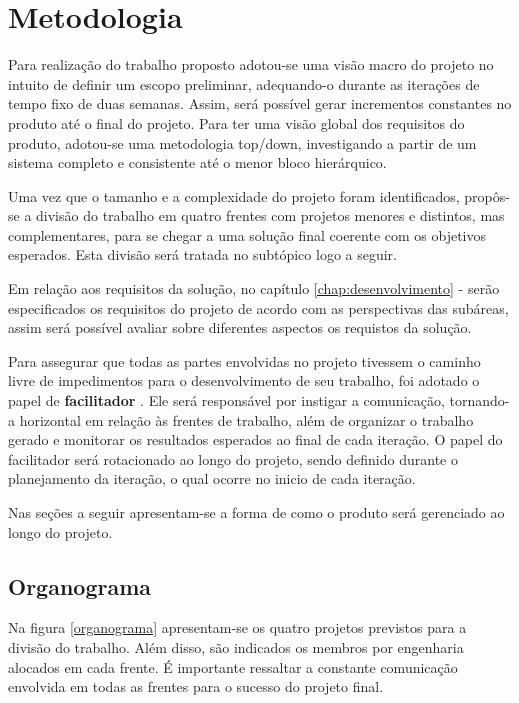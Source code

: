 \chapter{Metodologia}
\label{chap:metodologia}
	
	Para realização do trabalho proposto adotou-se uma visão macro do projeto no intuito de definir um escopo preliminar, adequando-o durante as iterações de tempo fixo de duas semanas. Assim, será possível gerar incrementos constantes no produto até o final do projeto. Para ter uma visão global dos requisitos do produto, adotou-se uma metodologia top/down, investigando a partir de um sistema completo e consistente até o menor bloco hierárquico.

	Uma vez que o tamanho e a complexidade do projeto foram identificados, propôs-se a divisão do trabalho em quatro frentes com projetos menores e distintos, mas complementares, para se chegar a uma solução final coerente com os objetivos esperados. Esta divisão será tratada no subtópico logo a seguir.

	Em relação aos requisitos da solução, no capítulo \ref{chap:desenvolvimento} -  serão especificados os requisitos do projeto de acordo com as perspectivas das subáreas, assim será possível avaliar sobre diferentes aspectos os requistos da solução.

	Para assegurar que todas as partes envolvidas no projeto tivessem o caminho livre de impedimentos para o desenvolvimento de seu trabalho, foi adotado o papel de \textbf{facilitador} \cite{Facilitador}. Ele será responsável por instigar a comunicação, tornando-a horizontal em relação às frentes de trabalho, além de organizar o trabalho gerado e monitorar os resultados esperados ao final de cada iteração. O papel do facilitador será rotacionado ao longo do projeto, sendo definido durante o planejamento da iteração, o qual ocorre no inicio de cada iteração.

	Nas seções a seguir apresentam-se a forma de como o produto será gerenciado ao longo do projeto.


	\section{Organograma}

		Na figura \ref{organograma} apresentam-se os quatro projetos previstos para a divisão do trabalho. Além disso, são indicados os membros por engenharia alocados em cada frente. É importante ressaltar a constante comunicação envolvida em todas as frentes para o sucesso do projeto final.

